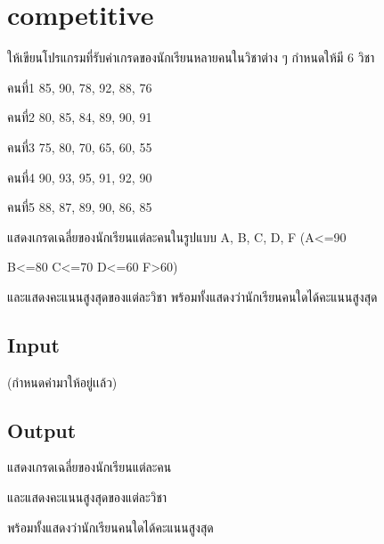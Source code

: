 \documentclass{article}
\begin{document}
\section*{competitive}

ให้เขียนโปรแกรมที่รับค่าเกรดของนักเรียนหลายคนในวิชาต่าง ๆ กำหนดให้มี 6 วิชา



คนที่1 85, 90, 78, 92, 88, 76



คนที่2 80, 85, 84, 89, 90, 91



คนที่3 75, 80, 70, 65, 60, 55



คนที่4 90, 93, 95, 91, 92, 90



คนที่5 88, 87, 89, 90, 86, 85



แสดงเกรดเฉลี่ยของนักเรียนแต่ละคนในรูปแบบ A, B, C, D, F (A\textless=90

B\textless=80 C\textless=70 D\textless=60 F\textgreater60)

และแสดงคะแนนสูงสุดของแต่ละวิชา พร้อมทั้งแสดงว่านักเรียนคนใดได้คะแนนสูงสุด



\subsection*{Input}
{(กำหนดค่ามาให้อยู่เเล้ว)}\\



\subsection*{Output}
{แสดงเกรดเฉลี่ยของนักเรียนแต่ละคน{และแสดงคะแนนสูงสุดของแต่ละวิชา

พร้อมทั้งแสดงว่านักเรียนคนใดได้คะแนนสูงสุด}}\\
\end{document}
